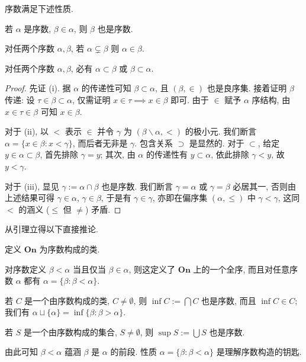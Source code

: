 \begin{lemma}\label{prop:ordinal-property}
	序数满足下述性质.
	\begin{compactenum}[(i)]
		\item 若 $\alpha$ 是序数, $\beta \in \alpha$, 则 $\beta$ 也是序数.
		\item 对任两个序数 $\alpha, \beta$, 若 $\alpha \subsetneq \beta$ 则 $\alpha \in \beta$.
		\item 对任两个序数 $\alpha, \beta$, 必有 $\alpha \subset \beta$ 或 $\beta \subset \alpha$.
	\end{compactenum}
\end{lemma}
\begin{proof}
	先证 (i). 据 $\alpha$ 的传递性可知 $\beta \subset \alpha$, 且 $(\beta, \in)$ 也是良序集. 接着证明 $\beta$ 传递: 设 $\tau \in \beta \subset \alpha$,  仅需证明 $x \in \tau \implies x \in \beta$ 即可. 由于 $\in$ 赋予 $\alpha$ 序结构, 由 $x \in \tau \in \beta$ 可知 $x \in \beta$.

	对于 (ii), 以 $<$ 表示 $\in$ 并令 $\gamma$ 为 $(\beta \smallsetminus \alpha, <)$ 的极小元. 我们断言 $\alpha = \{x \in \beta : x < \gamma \}$, 而后者无非是 $\gamma$. 包含关系 $\supset$ 是显然的. 对于 $\subset$, 给定 $y \in \alpha \subset \beta$, 首先排除 $\gamma = y$; 其次, 由 $\alpha$ 的传递性有 $y \subset \alpha$, 依此排除 $\gamma < y$, 故 $y < \gamma$.

	对于 (iii), 显见 $\gamma := \alpha \cap \beta$ 也是序数. 我们断言 $\gamma = \alpha$ 或 $\gamma = \beta$ 必居其一, 否则由上述结果可得 $\gamma \in \alpha$, $\gamma \in \beta$, 于是有 $\gamma \in \gamma$, 亦即在偏序集 $(\alpha, \leq)$ 中 $\gamma < \gamma$, 这同 $<$ 的涵义 ($\leq$ 但 $\neq$) 矛盾.
\end{proof}

从引理立得以下直接推论.
\begin{theorem}\label{prop:On-wellorder}
	定义 $\textbf{On}$ 为序数构成的类. 
	\begin{compactitem}
		\item 对序数定义 $\beta < \alpha$ 当且仅当 $\beta \in \alpha$, 则这定义了 $\textbf{On}$ 上的一个全序, 而且对任意序数 $\alpha$ 都有 $\alpha = \{ \beta : \beta < \alpha \}$.
		\item 若 $C$ 是一个由序数构成的类, $C \neq \emptyset$, 则 $\inf C := \bigcap C$ 也是序数, 而且 $\inf C \in C$; 我们有 $\alpha \sqcup \{\alpha\} = \inf\{ \beta: \beta > \alpha \}$.
		\item 若 $S$ 是一个由序数构成的集合, $S \neq \emptyset$, 则 $\sup S := \bigcup S$ 也是序数.
	\end{compactitem}
\end{theorem}
由此可知 $\beta < \alpha$ 蕴涵 $\beta$ 是 $\alpha$ 的前段. 性质 $\alpha = \{\beta: \beta < \alpha \}$ 是理解序数构造的钥匙.

